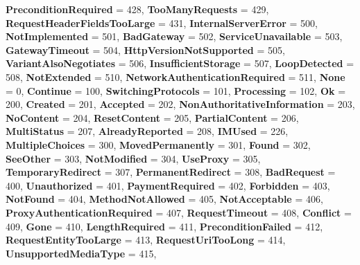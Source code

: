 \begin{DoxyCompactItemize}
\newline
{\bfseries Precondition\+Required} = 428, 
{\bfseries Too\+Many\+Requests} = 429, 
{\bfseries Request\+Header\+Fields\+Too\+Large} = 431, 
{\bfseries Internal\+Server\+Error} = 500, 
\newline
{\bfseries Not\+Implemented} = 501, 
{\bfseries Bad\+Gateway} = 502, 
{\bfseries Service\+Unavailable} = 503, 
{\bfseries Gateway\+Timeout} = 504, 
\newline
{\bfseries Http\+Version\+Not\+Supported} = 505, 
{\bfseries Variant\+Also\+Negotiates} = 506, 
{\bfseries Insufficient\+Storage} = 507, 
{\bfseries Loop\+Detected} = 508, 
\newline
{\bfseries Not\+Extended} = 510, 
{\bfseries Network\+Authentication\+Required} = 511, 
{\bfseries None} = 0, 
{\bfseries Continue} = 100, 
\newline
{\bfseries Switching\+Protocols} = 101, 
{\bfseries Processing} = 102, 
{\bfseries Ok} = 200, 
{\bfseries Created} = 201, 
\newline
{\bfseries Accepted} = 202, 
{\bfseries Non\+Authoritative\+Information} = 203, 
{\bfseries No\+Content} = 204, 
{\bfseries Reset\+Content} = 205, 
\newline
{\bfseries Partial\+Content} = 206, 
{\bfseries Multi\+Status} = 207, 
{\bfseries Already\+Reported} = 208, 
{\bfseries I\+M\+Used} = 226, 
\newline
{\bfseries Multiple\+Choices} = 300, 
{\bfseries Moved\+Permanently} = 301, 
{\bfseries Found} = 302, 
{\bfseries See\+Other} = 303, 
\newline
{\bfseries Not\+Modified} = 304, 
{\bfseries Use\+Proxy} = 305, 
{\bfseries Temporary\+Redirect} = 307, 
{\bfseries Permanent\+Redirect} = 308, 
\newline
{\bfseries Bad\+Request} = 400, 
{\bfseries Unauthorized} = 401, 
{\bfseries Payment\+Required} = 402, 
{\bfseries Forbidden} = 403, 
\newline
{\bfseries Not\+Found} = 404, 
{\bfseries Method\+Not\+Allowed} = 405, 
{\bfseries Not\+Acceptable} = 406, 
{\bfseries Proxy\+Authentication\+Required} = 407, 
\newline
{\bfseries Request\+Timeout} = 408, 
{\bfseries Conflict} = 409, 
{\bfseries Gone} = 410, 
{\bfseries Length\+Required} = 411, 
\newline
{\bfseries Precondition\+Failed} = 412, 
{\bfseries Request\+Entity\+Too\+Large} = 413, 
{\bfseries Request\+Uri\+Too\+Long} = 414, 
{\bfseries Unsupported\+Media\+Type} = 415, 
\newline

\end{DoxyCompactItemize}

